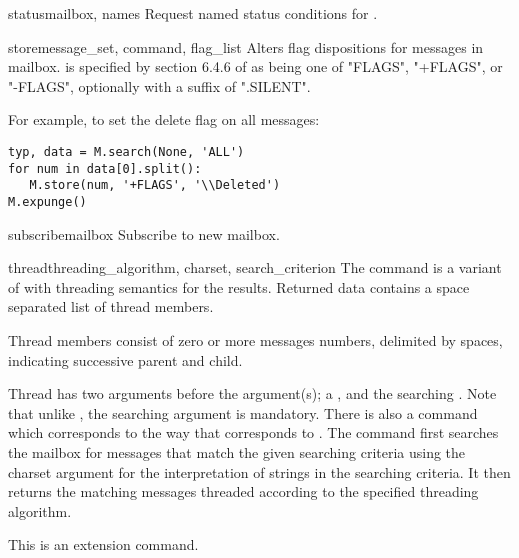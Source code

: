 \begin{methoddesc}{status}{mailbox, names}
  Request named status conditions for . 
\end{methoddesc}

\begin{methoddesc}{store}{message_set, command, flag_list}
  Alters flag dispositions for messages in mailbox.   is
  specified by section 6.4.6 of  as being one of "FLAGS", "+FLAGS",
  or "-FLAGS", optionally with a suffix of ".SILENT".

  For example, to set the delete flag on all messages:

\begin{verbatim}
typ, data = M.search(None, 'ALL')
for num in data[0].split():
   M.store(num, '+FLAGS', '\\Deleted')
M.expunge()
\end{verbatim}
\end{methoddesc}

\begin{methoddesc}{subscribe}{mailbox}
  Subscribe to new mailbox.
\end{methoddesc}

\begin{methoddesc}{thread}{threading_algorithm, charset,
                           search_criterion}
  The  command is a variant of  with
  threading semantics for the results.  Returned data contains a space
  separated list of thread members.

  Thread members consist of zero or more messages numbers, delimited
  by spaces, indicating successive parent and child.

  Thread has two arguments before the 
  argument(s); a , and the searching
  .  Note that unlike , the searching
   argument is mandatory.  There is also a  command which corresponds to  the way that
   corresponds to .  The 
  command first searches the mailbox for messages that match the given
  searching criteria using the charset argument for the interpretation
  of strings in the searching criteria. It then returns the matching
  messages threaded according to the specified threading algorithm.

  This is an  extension command. 
\end{methoddesc}

